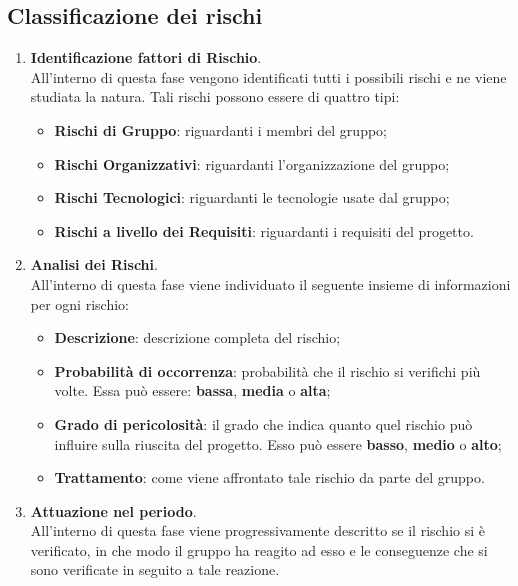 \subsection{Classificazione dei rischi}

\begin{enumerate}
		
\item \textbf{Identificazione fattori di Rischio}. \\ 
	  All'interno di questa fase vengono identificati tutti i possibili rischi e ne viene studiata la natura. Tali rischi possono essere di quattro tipi:
	\begin{itemize}
	\item \textbf{Rischi di Gruppo}: riguardanti i membri del gruppo; 
	\item \textbf{Rischi Organizzativi}: riguardanti l'organizzazione del gruppo;
	\item \textbf{Rischi Tecnologici}: riguardanti le tecnologie usate dal gruppo;
	\item \textbf{Rischi a livello dei Requisiti}: riguardanti i requisiti del progetto.
	\end{itemize}
				
\item \textbf{Analisi dei Rischi}. \\
	  All'interno di questa fase viene individuato il seguente insieme di informazioni per ogni rischio: 
	\begin{itemize}
	\item \textbf{Descrizione}: descrizione completa del rischio;
	\item \textbf{Probabilità di occorrenza}: probabilità che il rischio si verifichi più volte. Essa può essere: \textbf{bassa}, \textbf{media} o \textbf{alta};
	\item \textbf{Grado di pericolosità}: il grado che indica quanto quel rischio può influire sulla riuscita del progetto. Esso può essere \textbf{basso}, \textbf{medio} o \textbf{alto};
	\item \textbf{Trattamento}: come viene affrontato tale rischio da parte del gruppo.	
	\end{itemize}

\item \textbf{Attuazione nel periodo}. \\
	  All'interno di questa fase viene progressivamente descritto se il rischio si è verificato, in che modo il gruppo ha reagito ad esso e le conseguenze che si sono verificate in seguito a tale reazione.

\end{enumerate}

